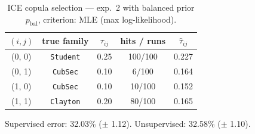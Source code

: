 \begin{table}[htbp]
  \centering
  \caption{ICE copula selection — exp.\ 2 with balanced prior $p_{\text{bal}}$, criterion: MLE (max log-likelihood).}
  \label{tab:exp3-exp2_bal_p__mle}
  \begin{tabular}{ccccc}
    \toprule
    $(i, j)$ & true family & $\tau_{ij}$ & hits / runs & $\hat\tau_{ij}$ \\
    \midrule
    (0, 0) & \texttt{Student} & 0.25 & 100/100 & 0.227 \\
    (0, 1) & \texttt{CubSec} & 0.10 & 6/100 & 0.164 \\
    (1, 0) & \texttt{CubSec} & 0.10 & 10/100 & 0.152 \\
    (1, 1) & \texttt{Clayton} & 0.20 & 80/100 & 0.165 \\
    \bottomrule
  \end{tabular}
  \par\smallskip Supervised error: 32.03\% ($\pm$ 1.12). Unsupervised: 32.58\% ($\pm$ 1.10).
\end{table}
